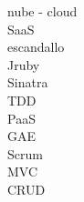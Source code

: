
nube - cloud \\
SaaS \\
escandallo \\
Jruby \\
Sinatra \\
TDD \\
PaaS \\
GAE \\
Scrum \\
MVC \\
CRUD \\